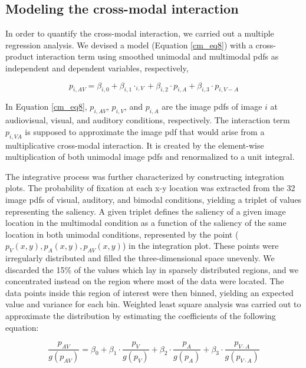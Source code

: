 \subsection{Modeling the cross-modal interaction}


In order to quantify the cross-modal interaction, we carried out a multiple
regression analysis. We devised a model (Equation \ref{cm_eq8}) with a
cross-product interaction term using smoothed unimodal and multimodal pdfs
as independent and dependent variables, respectively, 



\begin{equation} \label{cm_eq8}
p_{i,AV}=\beta_{i,0}+\beta_{i,1}\cdotp_{i,V}+\beta_{i,2} \cdot p_{i,A} +
\beta_{i,3} \cdot p_{i,V-A}  \end{equation} 

In Equation \ref{cm_eq8}, $p_{i,AV}$, $p_{i,V}$, and $p_{i,A}$ are the
image pdfs of image $i$ at audiovisual, visual, and auditory conditions,
respectively. The interaction term $p_{i,VA}$ is supposed to approximate
the image pdf that would arise from a multiplicative cross-modal
interaction. It is created by the element-wise multiplication of both
unimodal image pdfs and renormalized to a unit integral.


The integrative process was further characterized by constructing
integration plots. The probability of fixation at each x-y location was
extracted from the 32 image pdfs of visual, auditory, and bimodal
conditions, yielding a triplet of values representing the saliency. A given
triplet defines the saliency of a given image location in the multimodal
condition as a function of the saliency of the same location in both
unimodal conditions, represented by the point ($p_V(x, y), p_A(x, y),
p_{AV}(x, y)$) in the integration plot. These points were irregularly
distributed and filled the three-dimensional space unevenly. We discarded
the 15\% of the values which lay in sparsely distributed regions, and we
concentrated instead on the region where most of the data were located. The
data points inside this region of interest were then binned, yielding an
expected value and variance for each bin. Weighted least square analysis
was carried out to approximate the distribution by estimating the
coefficients of the following equation:

\begin{equation} \frac{p_{AV}}{g(p_{AV})} = \beta_0 + \beta_1 \cdot
\frac{p_V}{g(p_V)} + \beta_2 \cdot \frac{p_A}{g(p_A)} + \beta_3 \cdot
\frac{p_{V\cdot A}} {g(p_{V\cdot A})} \label{cm_eq9} \end{equation} 


